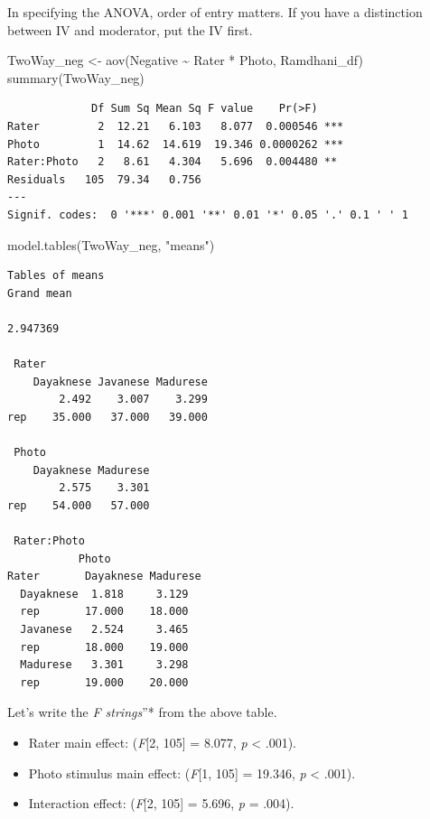 \documentclass[
  11pt,
]{book}
\newenvironment{Shaded}{\begin{snugshade}}{\end{snugshade}}
\newcommand{\FunctionTok}[1]{\textcolor[rgb]{0.00,0.00,0.00}{#1}}
\newcommand{\NormalTok}[1]{#1}
\newcommand{\OtherTok}[1]{\textcolor[rgb]{0.56,0.35,0.01}{#1}}
\newcommand{\SpecialCharTok}[1]{\textcolor[rgb]{0.00,0.00,0.00}{#1}}
\newcommand{\StringTok}[1]{\textcolor[rgb]{0.31,0.60,0.02}{#1}}
\providecommand{\tightlist}{%
  \setlength{\itemsep}{0pt}\setlength{\parskip}{0pt}}
\begin{document}
In specifying the ANOVA, order of entry matters. If you have a distinction between IV and moderator, put the IV first.

\begin{Shaded}
\begin{Highlighting}[]
\NormalTok{TwoWay\_neg }\OtherTok{\textless{}{-}} \FunctionTok{aov}\NormalTok{(Negative }\SpecialCharTok{\textasciitilde{}}\NormalTok{ Rater }\SpecialCharTok{*}\NormalTok{ Photo, Ramdhani\_df)}
\FunctionTok{summary}\NormalTok{(TwoWay\_neg)}
\end{Highlighting}
\end{Shaded}

\begin{verbatim}
             Df Sum Sq Mean Sq F value    Pr(>F)    
Rater         2  12.21   6.103   8.077  0.000546 ***
Photo         1  14.62  14.619  19.346 0.0000262 ***
Rater:Photo   2   8.61   4.304   5.696  0.004480 ** 
Residuals   105  79.34   0.756                      
---
Signif. codes:  0 '***' 0.001 '**' 0.01 '*' 0.05 '.' 0.1 ' ' 1
\end{verbatim}

\begin{Shaded}
\begin{Highlighting}[]
\FunctionTok{model.tables}\NormalTok{(TwoWay\_neg, }\StringTok{"means"}\NormalTok{)}
\end{Highlighting}
\end{Shaded}

\begin{verbatim}
Tables of means
Grand mean
         
2.947369 

 Rater 
    Dayaknese Javanese Madurese
        2.492    3.007    3.299
rep    35.000   37.000   39.000

 Photo 
    Dayaknese Madurese
        2.575    3.301
rep    54.000   57.000

 Rater:Photo 
           Photo
Rater       Dayaknese Madurese
  Dayaknese  1.818     3.129  
  rep       17.000    18.000  
  Javanese   2.524     3.465  
  rep       18.000    19.000  
  Madurese   3.301     3.298  
  rep       19.000    20.000  
\end{verbatim}

Let's write the \emph{F strings}''* from the above table.

\begin{itemize}
\tightlist
\item
  Rater main effect: (\emph{F}{[}2, 105{]} = 8.077, \emph{p} \textless{} .001).
\item
  Photo stimulus main effect: (\emph{F}{[}1, 105{]} = 19.346, \emph{p} \textless{} .001).
\item
  Interaction effect: (\emph{F}{[}2, 105{]} = 5.696, \emph{p} = .004).
\end{itemize}
\end{document}
